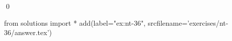 
\begin{ex} 
  \label{ex:nt-36}
  
  \qed
\end{ex} 
\begin{python0}
from solutions import *
add(label="ex:nt-36",
    srcfilename='exercises/nt-36/answer.tex') 
\end{python0}
